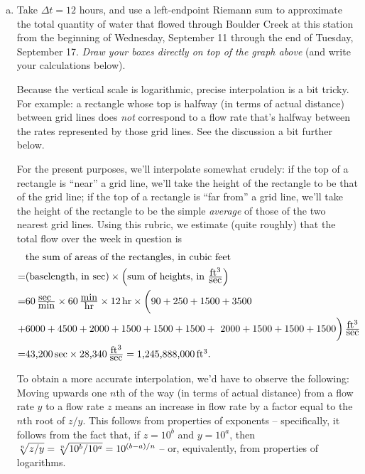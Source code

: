 \documentclass[12pt]{article}
\def\Red{\color{red}}
\def\Red{\color{red}}
\begin{document}
\begin{enumerate}[(a)]\addtocounter{enumi}{3}
\item Take $\Delta t = 12$ hours, and use a left-endpoint Riemann sum to approximate the total quantity of water that flowed through Boulder Creek at this station from the beginning of Wednesday, September 11 through the end of Tuesday, September 17. {\it Draw your boxes directly on top of the graph above}   (and write your calculations below).

\Red Because the vertical scale is logarithmic, precise interpolation is a bit tricky.  For example:  a rectangle  whose top is halfway  (in terms of actual distance)  between grid lines does {\it not} correspond to a flow rate that's halfway between the rates represented by those grid lines. See the discussion a bit further below.


For the present purposes, we'll interpolate somewhat crudely:  if the top of a rectangle is ``near'' a grid line, we'll take the height of the rectangle to be that of the grid line; if the top of a rectangle is ``far from'' a grid line, we'll take the height of the rectangle to be the simple {\it average} of those of the two nearest grid lines.  Using this rubric, we estimate (quite roughly)  that the total flow  over the week in question is
\begin{align*}&\hbox{the sum of areas of the rectangles, in cubic feet}\\=&
\hbox{(baselength, in sec)} \times \Bigl(\hbox{sum of heights, in}\  {\textstyle \frac{\hbox{ft$^3$}}{\hbox{sec}}}\Bigr)\\=& 60\,  {\textstyle\frac{\hbox{sec }}{\hbox{min}}}\times 60\,  {\textstyle\frac{\hbox{min}}{\hbox{hr}}}\times12 \, \hbox{hr}\times  \biggl(90 + 250 + 1500 + 3500\\+&  6000 + 4500 + 2000 + 1500 + 1500 + 1500 + \
2000 + 1500 + 1500 + 1500\biggr) \, {\textstyle\frac{\hbox{ft$^3$}}{\hbox{sec}}}
\\=& \hbox{43,200} \, \hbox{sec} \times \hbox{28,340}\, {\textstyle\frac{\hbox{ft$^3$}}{\hbox{sec}}}  =\hbox{1,245,888,000}\, \hbox{ft$^3$}.\end{align*} 


To obtain a more accurate interpolation, we'd have to observe the following:  Moving upwards one $n$th of the way (in terms of actual distance) from a flow rate $y$ to a flow rate $z$ means an  increase in  flow rate by a factor equal to the $n$th root of  $z/y$.  This follows from properties of exponents  -- specifically, it follows from the fact that, if $z=10^b$ and $y=10^a$, then $ \root{n}\of{z/y}=\root{n}\of{10^b/10^a}=10^{(b-a)/n}$ -- or, equivalently, from properties of logarithms.


\end{enumerate}
\end{document}
